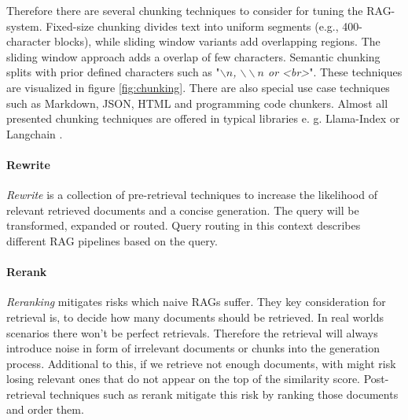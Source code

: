 Therefore there are several chunking techniques to consider for tuning the RAG-system. Fixed-size chunking divides text into uniform segments (e.g., 400-character blocks), while sliding window variants add overlapping regions. The sliding window approach adds a overlap of few characters. Semantic chunking splits with prior defined characters such as "\textit{$\backslash n$, $\backslash\backslash n$ or <br>}". These techniques are visualized in figure \ref{fig:chunking}. There are also special use case techniques such as Markdown, JSON, HTML and programming code chunkers. Almost all presented chunking techniques are offered in typical libraries e. g. Llama-Index \cite{Liu_LlamaIndex_2022} or Langchain \cite{Chase_LangChain_2022}.



\paragraph{Rewrite}
\label{sec:rewrite}
\textit{Rewrite} is a collection of pre-retrieval techniques to increase the likelihood of relevant retrieved documents and a concise generation. The query will be transformed, expanded or routed. Query routing in this context describes different RAG pipelines based on the query.\cite{Gao.18.12.2023}

\paragraph{Rerank}
\label{sec:rerank}
\textit{Reranking} mitigates risks which naive RAGs suffer. They key consideration for retrieval is, to decide how many documents should be retrieved. In real worlds scenarios there won't be perfect retrievals. Therefore the retrieval will always introduce noise in form of irrelevant documents or chunks into the generation process. Additional to this, if we retrieve not enough documents, with might risk losing relevant ones that do not appear on the top of the similarity score. Post-retrieval techniques such as rerank mitigate this risk by ranking those documents and order them.\cite{Gao.18.12.2023}


